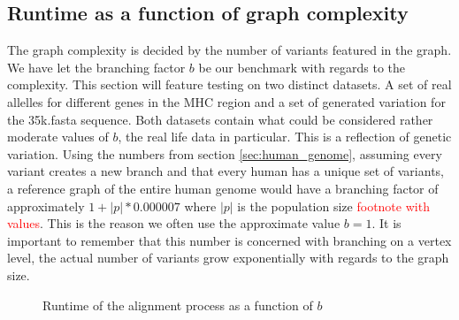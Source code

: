 \documentclass[thesis.tex]{subfiles}
\begin{document}
\subsection*{Runtime as a function of graph complexity}
\label{sec:runtime_complexity}
The graph complexity is decided by the number of variants featured in the graph. We have let the branching factor $b$ be our benchmark with regards to the complexity. This section will feature testing on two distinct datasets. A set of real allelles for different genes in the MHC region and a set of generated variation for the 35k.fasta sequence. Both datasets contain what could be considered rather moderate values of $b$, the real life data in particular. This is a reflection of genetic variation. Using the numbers from section \ref{sec:human_genome}, assuming every variant creates a new branch and that every human has a unique set of variants, a reference graph of the entire human genome would have a branching factor of approximately $1 + |p|*0.000007$ where $|p|$ is the population size \textcolor{red}{footnote with values}. This is the reason we often use the approximate value $b=1$. It is important to remember that this number is concerned with branching on a vertex level, the actual number of variants grow exponentially with regards to the graph size.
\begin{figure}
  \caption{Runtime of the alignment process as a function of $b$}
  \label{fig:runtime_s}
\end{figure}
\end{document}

